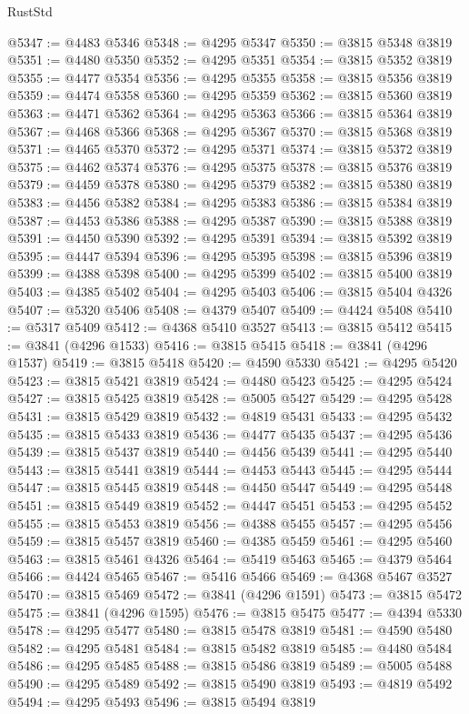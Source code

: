 \begin{lexlean}{RustStd}
\begin{coremodule}
@5347 := @4483 @5346
@5348 := @4295 @5347
@5350 := @3815 @5348 @3819
@5351 := @4480 @5350
@5352 := @4295 @5351
@5354 := @3815 @5352 @3819
@5355 := @4477 @5354
@5356 := @4295 @5355
@5358 := @3815 @5356 @3819
@5359 := @4474 @5358
@5360 := @4295 @5359
@5362 := @3815 @5360 @3819
@5363 := @4471 @5362
@5364 := @4295 @5363
@5366 := @3815 @5364 @3819
@5367 := @4468 @5366
@5368 := @4295 @5367
@5370 := @3815 @5368 @3819
@5371 := @4465 @5370
@5372 := @4295 @5371
@5374 := @3815 @5372 @3819
@5375 := @4462 @5374
@5376 := @4295 @5375
@5378 := @3815 @5376 @3819
@5379 := @4459 @5378
@5380 := @4295 @5379
@5382 := @3815 @5380 @3819
@5383 := @4456 @5382
@5384 := @4295 @5383
@5386 := @3815 @5384 @3819
@5387 := @4453 @5386
@5388 := @4295 @5387
@5390 := @3815 @5388 @3819
@5391 := @4450 @5390
@5392 := @4295 @5391
@5394 := @3815 @5392 @3819
@5395 := @4447 @5394
@5396 := @4295 @5395
@5398 := @3815 @5396 @3819
@5399 := @4388 @5398
@5400 := @4295 @5399
@5402 := @3815 @5400 @3819
@5403 := @4385 @5402
@5404 := @4295 @5403
@5406 := @3815 @5404 @4326
@5407 := @5320 @5406
@5408 := @4379 @5407
@5409 := @4424 @5408
@5410 := @5317 @5409
@5412 := @4368 @5410 @3527
@5413 := @3815 @5412
@5415 := @3841 (@4296 @1533)
@5416 := @3815 @5415
@5418 := @3841 (@4296 @1537)
@5419 := @3815 @5418
@5420 := @4590 @5330
@5421 := @4295 @5420
@5423 := @3815 @5421 @3819
@5424 := @4480 @5423
@5425 := @4295 @5424
@5427 := @3815 @5425 @3819
@5428 := @5005 @5427
@5429 := @4295 @5428
@5431 := @3815 @5429 @3819
@5432 := @4819 @5431
@5433 := @4295 @5432
@5435 := @3815 @5433 @3819
@5436 := @4477 @5435
@5437 := @4295 @5436
@5439 := @3815 @5437 @3819
@5440 := @4456 @5439
@5441 := @4295 @5440
@5443 := @3815 @5441 @3819
@5444 := @4453 @5443
@5445 := @4295 @5444
@5447 := @3815 @5445 @3819
@5448 := @4450 @5447
@5449 := @4295 @5448
@5451 := @3815 @5449 @3819
@5452 := @4447 @5451
@5453 := @4295 @5452
@5455 := @3815 @5453 @3819
@5456 := @4388 @5455
@5457 := @4295 @5456
@5459 := @3815 @5457 @3819
@5460 := @4385 @5459
@5461 := @4295 @5460
@5463 := @3815 @5461 @4326
@5464 := @5419 @5463
@5465 := @4379 @5464
@5466 := @4424 @5465
@5467 := @5416 @5466
@5469 := @4368 @5467 @3527
@5470 := @3815 @5469
@5472 := @3841 (@4296 @1591)
@5473 := @3815 @5472
@5475 := @3841 (@4296 @1595)
@5476 := @3815 @5475
@5477 := @4394 @5330
@5478 := @4295 @5477
@5480 := @3815 @5478 @3819
@5481 := @4590 @5480
@5482 := @4295 @5481
@5484 := @3815 @5482 @3819
@5485 := @4480 @5484
@5486 := @4295 @5485
@5488 := @3815 @5486 @3819
@5489 := @5005 @5488
@5490 := @4295 @5489
@5492 := @3815 @5490 @3819
@5493 := @4819 @5492
@5494 := @4295 @5493
@5496 := @3815 @5494 @3819

\end{coremodule}
\end{lexlean}
